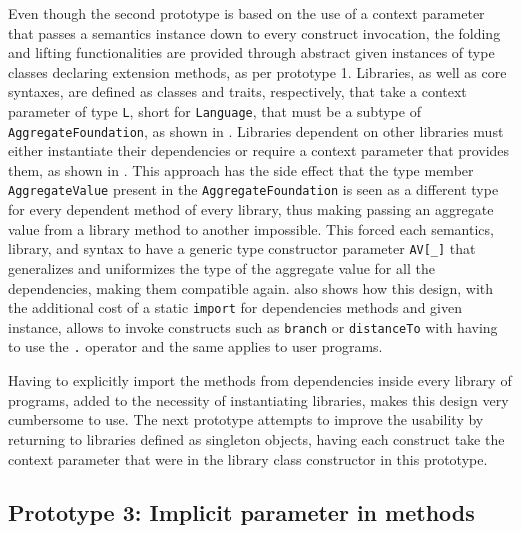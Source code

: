 Even though the second prototype is based on the use of a context parameter that passes a semantics instance down to every construct invocation, the folding and lifting functionalities are provided through abstract given instances of type classes declaring extension methods, as per prototype 1.
%
Libraries, as well as core syntaxes, are defined as classes and traits, respectively, that take a context parameter of type \texttt{L}, short for \texttt{Language}, that must be a subtype of \texttt{AggregateFoundation}, as shown in .
%
Libraries dependent on other libraries must either instantiate their dependencies or require a context parameter that provides them, as shown in .
%
This approach has the side effect that the type member \texttt{AggregateValue} present in the \texttt{AggregateFoundation} is seen as a different type for every dependent method of every library, thus making passing an aggregate value from a library method to another impossible.
%
This forced each semantics, library, and syntax to have a generic type constructor parameter \texttt{AV[\_]} that generalizes and uniformizes the type of the aggregate value for all the dependencies, making them compatible again.
%
 also shows how this design, with the additional cost of a static \texttt{import} for dependencies methods and given instance, allows to invoke constructs such as \texttt{branch} or \texttt{distanceTo} with having to use the \texttt{.} operator and the same applies to user programs.




Having to explicitly import the methods from dependencies inside every library of programs, added to the necessity of instantiating libraries, makes this design very cumbersome to use.
%
The next prototype attempts to improve the usability by returning to libraries defined as singleton objects, having each construct take the context parameter that were in the library class constructor in this prototype.


\subsection{Prototype 3: Implicit parameter in methods} \label{chap:design->sec:dsl->subsec:prototype-3-implicit-parameter-in-methods}


